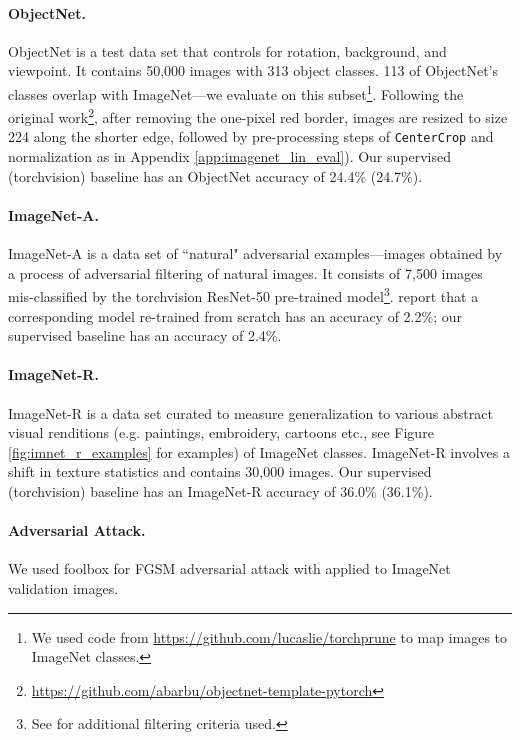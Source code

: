 \documentclass[twoside,11pt]{article}
\begin{document}
\paragraph{ObjectNet.} ObjectNet \citep{objectnet} is a test data set that controls for rotation, background, and viewpoint. It contains 50,000 images with 313 object classes. 113 of ObjectNet's classes overlap with ImageNet---we evaluate on this subset\footnote{We used code from \url{https://github.com/lucaslie/torchprune} to map images to ImageNet classes.}. Following the original work\footnote{\url{https://github.com/abarbu/objectnet-template-pytorch}}, after removing the one-pixel red border, images are resized to size 224 along the shorter edge, followed by  pre-processing steps of \texttt{CenterCrop} and normalization as in Appendix \ref{app:imagenet_lin_eval}). Our supervised (torchvision) baseline has an ObjectNet accuracy of 24.4\% (24.7\%).

\paragraph{ImageNet-A.} ImageNet-A \citep{hendrycks2019nae} is a data set of “natural" adversarial examples---images obtained by a process of adversarial filtering of natural images. It consists of 7,500 images mis-classified by the torchvision ResNet-50 pre-trained model\footnote{See \citet{hendrycks2019nae} for additional filtering criteria used.}. \citet{hendrycks2019nae} report that a corresponding model re-trained from scratch has an accuracy of 2.2\%; our supervised baseline has an accuracy of 2.4\%.

\paragraph{ImageNet-R.} ImageNet-R is a data set curated to measure generalization to various abstract visual  renditions (e.g. paintings, embroidery, cartoons etc., see Figure \ref{fig:imnet_r_examples} for examples) of  ImageNet classes. ImageNet-R involves a shift in texture statistics and contains 30,000 images. Our supervised (torchvision) baseline has an ImageNet-R accuracy of 36.0\% (36.1\%).

\paragraph{Adversarial Attack.}
We used foolbox \citep{foolbox_rauber2017} for  FGSM adversarial attack with  applied to ImageNet validation images.
\end{document}
